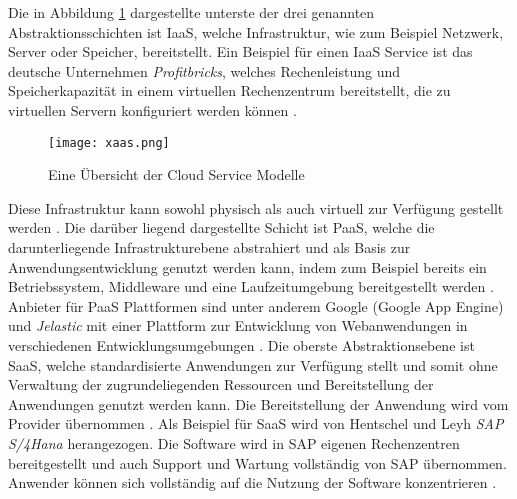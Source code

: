 Die in Abbildung \ref{fig:XaaS} dargestellte unterste der drei genannten Abstraktionsschichten ist \ac{IaaS}, welche Infrastruktur, wie zum Beispiel Netzwerk, Server oder Speicher, bereitstellt. Ein Beispiel für einen \ac{IaaS} Service ist das deutsche Unternehmen \textit{Profitbricks}, welches Rechenleistung und Speicherkapazität in einem virtuellen Rechenzentrum bereitstellt, die zu virtuellen Servern konfiguriert werden können \cite[Vgl.][S. 12]{Reinheimer2018}.

\begin{figure}[H]
    \centering
    \texttt{[image: xaas.png]}
    \caption{Eine Übersicht der Cloud Service Modelle \cite[Eigene Darstellung nach][S. 33]{Maenhaut2016}\cite[Ergänzt durch][]{Toroman2018}}
    \label{fig:XaaS}
\end{figure}

Diese Infrastruktur kann sowohl physisch als auch virtuell zur Verfügung gestellt werden \cite[Vgl.][S. 9f]{Reinheimer2018}. Die darüber liegend dargestellte Schicht ist \ac{PaaS}, welche die darunterliegende Infrastrukturebene abstrahiert und als Basis zur Anwendungsentwicklung genutzt werden kann, indem zum Beispiel bereits ein Betriebssystem, Middleware und eine Laufzeitumgebung bereitgestellt werden \cite[Vgl.][S. 10]{Reinheimer2018}. Anbieter für \ac{PaaS} Plattformen sind unter anderem Google (Google App Engine) und \textit{Jelastic} mit einer Plattform zur Entwicklung von Webanwendungen in verschiedenen Entwicklungsumgebungen \cite[Vgl.][S. 13]{Reinheimer2018}. Die oberste Abstraktionsebene ist \ac{SaaS}, welche standardisierte Anwendungen zur Verfügung stellt und somit ohne Verwaltung der zugrundeliegenden Ressourcen und Bereitstellung der Anwendungen genutzt werden kann. Die Bereitstellung der Anwendung wird vom Provider übernommen \cite[Vgl.][S. 11]{Reinheimer2018}. Als Beispiel für \ac{SaaS} wird von Hentschel und Leyh \textit{SAP S/4Hana} herangezogen. Die Software wird in SAP eigenen Rechenzentren bereitgestellt und auch Support und Wartung vollständig von SAP übernommen. Anwender können sich vollständig auf die Nutzung der Software konzentrieren \cite[Vgl.][S. 14]{Reinheimer2018}. \pagebreak

